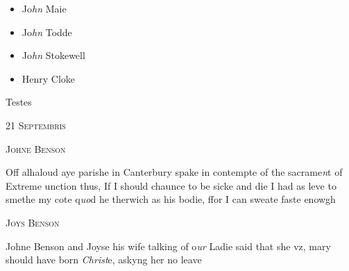 \documentclass[12pt, a4paper]{book}
\begin{document}
	\begin{itemize}
		\item[]Jo\textit{hn} Maie
		\item[]Jo\textit{hn} Todde
		\item[]Jo\textit{hn} Stokewell
		\item[]Henry Cloke
	\end{itemize}
	
		\ifthenelse{\isodd{\thepage}}
		{\reversemarginpar}
		{\normalmarginpar}
		
		
		Testes

 

            
            
               
				\begin{center} \begin{large} {\scshape 
                  21 Septembris
               } \end{large} \end{center}
			
               
               	
				\begin{center}  {\scshape Johne Benson}  \end{center}
			
               	
               		
				\marginpar[\vspace{0.5cm}{\textcolor{Gray}{offensive}}]{}
			
               		
		\ifthenelse{\isodd{\thepage}}
		{\reversemarginpar}
		{\normalmarginpar}
		Off alhaloud aye parishe in Canterbury spake
 in contempte of the sacrame\textit{n}t of Extreme unction
  thus, If I should chaunce to be sicke and die
 I had as leve to smethe my cote q\textit{uo}d he therwich
 as his bodie, ffor I can sweate faste enowgh
 

               
               	
				\begin{center}  {\scshape Joys Benson}  \end{center}
			
               	
               		
			
               		
		\ifthenelse{\isodd{\thepage}}
		{\reversemarginpar}
		{\normalmarginpar}
		Johne Benson and Joyse his wife talking of o\textit{ur}
  Ladie said that she vz, mary should have born
 \textit{Christ}e, askyng her no leave
\end{document}
